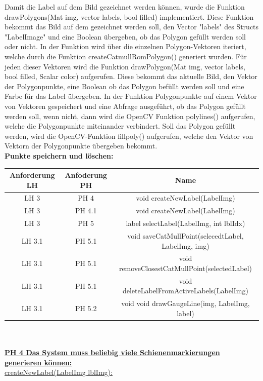 \documentclass[11pt]{scrartcl}
\begin{document}
\noindent
Damit die Label auf dem Bild gezeichnet werden können, wurde die Funktion drawPolygons(Mat img, vector labels, bool filled) implementiert. Diese Funktion bekommt das Bild  auf dem gezeichnet werden soll, den Vector "labels" des Structs "LabelImage" und eine Boolean übergeben, ob das Polygon gefüllt werden soll oder nicht. In der Funktion wird über die einzelnen Polygon-Vektoren iteriert, welche durch die Funktion createCatmullRomPolygon() generiert wurden. Für jeden dieser Vektoren wird die Funktion drawPolygon(Mat img, vector labels, bool filled, Scalar color) aufgerufen. Diese bekommt das aktuelle Bild, den Vektor der Polygonpunkte, eine Boolean ob das Polygon befüllt werden soll und eine Farbe für das Label übergeben. In der Funktion Polygonpunkte auf einem Vektor von Vektoren gespeichert und eine Abfrage ausgeführt, ob das Polygon gefüllt werden soll, wenn nicht, dann wird die OpenCV Funktion polylines() aufgerufen, welche die Polygonpunkte miteinander verbindert. Soll das Polygon gefüllt werden, wird die OpenCV-Funktion fillpoly() aufgerufen, welche den Vektor von Vektorn der Polygonpunkte übergeben bekommt. 
\\

\noindent
\textbf{Punkte speichern und löschen:}
\\

\noindent
\begin{tabular}[h]{c|c|c}
Anforderung LH & Anfoderung PH & Name \\
\hline
LH 3& PH 4 & void createNewLabel(LabelImg)\\
LH 3 & PH 4.1 & void createNewLabel(LabelImg)\\
LH 3 & PH 5 &label selectLabel(LabelImg, int lblIdx)\\
LH 3.1 & PH 5.1 & void saveCatMullPoint(selecedtLabel, LabelImg, img)\\
LH 3.1 & PH 5.1 & void removeClosestCatMullPoint(selectedLabel)\\
LH 3.1 & PH 5.1 & void deleteLabelFromActiveLabels(LabelImg)\\
LH 3.1 & PH 5.2 & void void drawGaugeLine(img, LabelImg, label)\\
\end{tabular}
\\
\\

\noindent
\underline{\textbf {PH 4   Das System muss beliebig viele Schienenmarkierungen generieren können:}}
\\

\noindent
\underline{createNewLabel(LabelImg lblImg):}
\\
\end{document}
